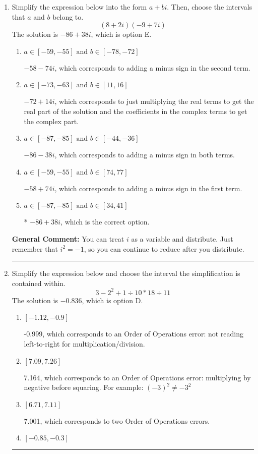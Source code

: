 \documentclass{extbook}[14pt]
\newcommand{\litem}[1]{\item #1

\rule{\textwidth}{0.4pt}}
\begin{document}
\begin{enumerate}\litem{
Simplify the expression below into the form $a+bi$. Then, choose the intervals that $a$ and $b$ belong to.
\[ (8 + 2 i)(-9 + 7 i) \]The solution is \( -86 + 38 i \), which is option E.\begin{enumerate}[label=\Alph*.]
\item \( a \in [-59, -55] \text{ and } b \in [-78, -72] \)

 $-58 - 74 i$, which corresponds to adding a minus sign in the second term.
\item \( a \in [-73, -63] \text{ and } b \in [11, 16] \)

 $-72 + 14 i$, which corresponds to just multiplying the real terms to get the real part of the solution and the coefficients in the complex terms to get the complex part.
\item \( a \in [-87, -85] \text{ and } b \in [-44, -36] \)

 $-86 - 38 i$, which corresponds to adding a minus sign in both terms.
\item \( a \in [-59, -55] \text{ and } b \in [74, 77] \)

 $-58 + 74 i$, which corresponds to adding a minus sign in the first term.
\item \( a \in [-87, -85] \text{ and } b \in [34, 41] \)

* $-86 + 38 i$, which is the correct option.
\end{enumerate}

\textbf{General Comment:} You can treat $i$ as a variable and distribute. Just remember that $i^2=-1$, so you can continue to reduce after you distribute.
}
\litem{
Simplify the expression below and choose the interval the simplification is contained within.
\[ 3 - 2^2 + 1 \div 10 * 18 \div 11 \]The solution is \( -0.836 \), which is option D.\begin{enumerate}[label=\Alph*.]
\item \( [-1.12, -0.9] \)

 -0.999, which corresponds to an Order of Operations error: not reading left-to-right for multiplication/division.
\item \( [7.09, 7.26] \)

 7.164, which corresponds to an Order of Operations error: multiplying by negative before squaring. For example: $(-3)^2 \neq -3^2$
\item \( [6.71, 7.11] \)

 7.001, which corresponds to two Order of Operations errors.
\item \( [-0.85, -0.3] \)


\end{enumerate}}
\end{enumerate}
\end{document}
